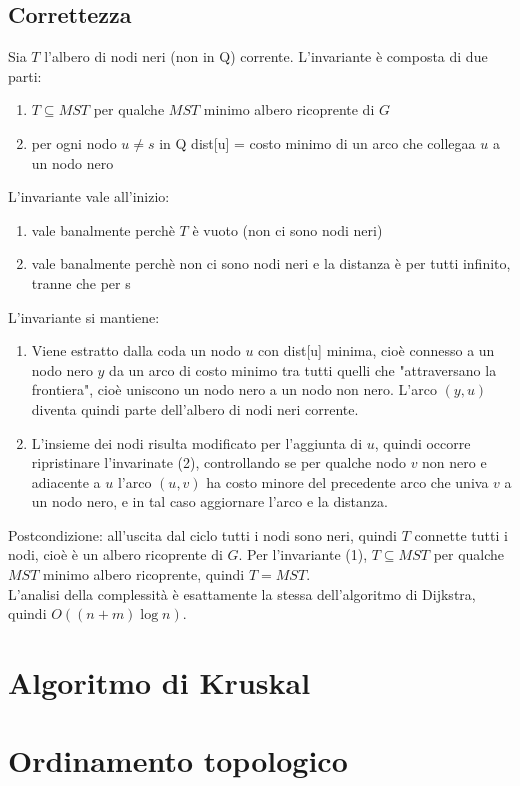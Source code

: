 \documentclass[12pt]{article}
\begin{document}
\subsection{Correttezza}
Sia $T$ l'albero di nodi neri (non in Q) corrente. L'invariante è composta di due parti:
\begin{enumerate}
    \item $T \subseteq MST$ per qualche $MST$ minimo albero ricoprente di $G$
    \item per ogni nodo $u\neq s$ in Q dist[u] = costo minimo di un arco che collegaa $u$ a un nodo nero
\end{enumerate}
L'invariante vale all'inizio:
\begin{enumerate}
    \item vale banalmente perchè $T$ è vuoto (non ci sono nodi neri)
    \item vale banalmente perchè non ci sono nodi neri e la distanza è  per tutti infinito, tranne che per s
\end{enumerate}
L'invariante si mantiene:
\begin{enumerate}
    \item Viene estratto dalla coda un nodo $u$ con dist[u] minima, cioè connesso a un nodo nero $y$ da un arco di costo minimo tra tutti quelli che "attraversano la frontiera", cioè uniscono un nodo nero a un nodo non nero. L'arco $(y,u)$ diventa quindi parte dell'albero di nodi neri corrente.
    \item L'insieme dei nodi risulta modificato per l'aggiunta di $u$, quindi occorre ripristinare l'invarinate (2), controllando se per qualche nodo $v$ non nero e adiacente a $u$ l'arco $(u,v)$ ha costo minore del precedente arco che univa $v$ a un nodo nero, e in tal caso aggiornare l'arco e la distanza.
\end{enumerate}
Postcondizione: all'uscita dal ciclo tutti i nodi sono neri, quindi $T$ connette tutti i nodi, cioè è un albero ricoprente di $G$. Per l'invariante (1), $T\subseteq MST$ per qualche $MST$ minimo albero ricoprente, quindi $T=MST$.\\
L'analisi della complessità è esattamente la stessa dell'algoritmo di Dijkstra, quindi $O((n+m)\log n)$.
\section{Algoritmo di Kruskal}
\section{Ordinamento topologico}
\end{document}
